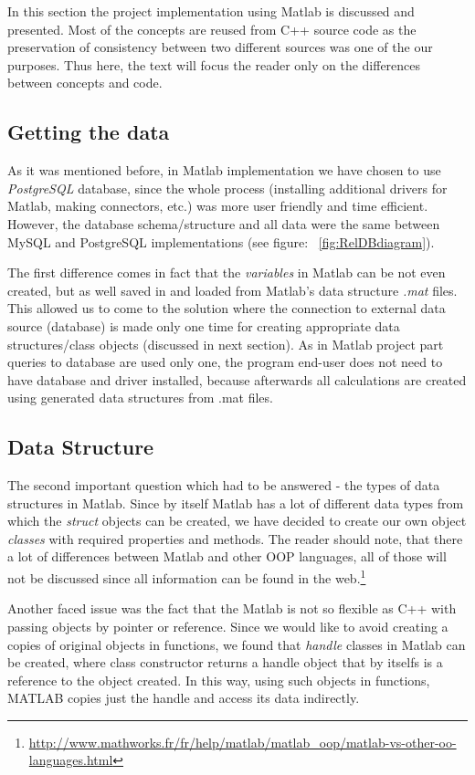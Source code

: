 \documentclass{article}
\begin{document}
In this section the project implementation using Matlab is discussed and presented. Most of the concepts are reused from C++ source code as the preservation of consistency between two different sources was one of the our purposes. Thus here, the text will focus the reader only on the differences between concepts and code.

\subsection{Getting the data}

As it was mentioned before, in Matlab implementation we have chosen to use \textit{PostgreSQL} database, since the whole process (installing additional drivers for Matlab, making connectors, etc.) was more user friendly and time efficient. However, the database schema/structure and all data were the same between MySQL and PostgreSQL implementations (see figure: ~\ref{fig:RelDBdiagram}).

The first difference comes in fact that the \textit{variables} in Matlab can be not even created, but as well saved in and loaded from Matlab's data structure \textit{.mat} files. This allowed us to come to the solution where the connection to external data source (database) is made only one time for creating appropriate data structures/class objects (discussed in next section). As in Matlab project part queries to database are used only one, the program end-user does not need to have database and driver installed, because afterwards all calculations are created using generated data structures from .mat files.

\subsection{Data Structure}

The second important question which had to be answered - the types of data structures in Matlab.
Since by itself Matlab has a lot of different data types from which the \textit{struct} objects can be created, we have decided to create our  own object \textit{classes} with required properties and methods. The reader should note, that there a lot of differences between Matlab and other OOP languages, all of those will not be discussed since all information can be found in the web.\footnote{
\url{http://www.mathworks.fr/fr/help/matlab/matlab_oop/matlab-vs-other-oo-languages.html}
}

Another faced issue was the fact that the Matlab is not so flexible as C++ with passing objects by pointer or reference. Since we would like to avoid creating a copies of original objects in functions, we found that \textit{handle} classes in Matlab can be created, where class constructor returns a handle object that by itselfs is a reference to the object created. In this way, using such objects in functions, MATLAB copies just the handle and access its data indirectly.
\end{document}
